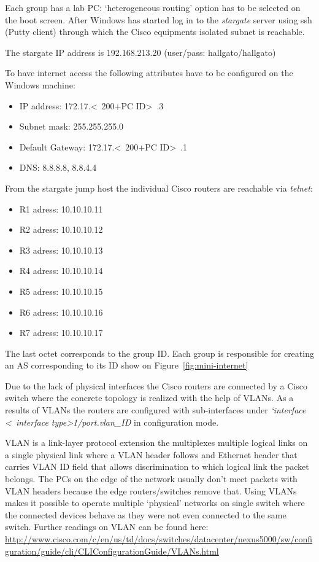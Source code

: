 \documentclass[a4paper]{article}
\begin{document}
Each group has a lab PC: `heterogeneous routing' option has to be selected on the boot screen. After Windows has started
log in to the \emph{stargate} server using ssh (Putty client) through which the Cisco equipments isolated subnet is reachable.

The stargate IP address is 192.168.213.20 (user/pass: hallgato/hallgato)

To have internet access the following attributes have to be configured on the Windows machine:
\begin{itemize}
    \item IP address: 172.17.\textless~200+PC ID\textgreater~.3
    \item Subnet mask: 255.255.255.0
    \item Default Gateway: 172.17.\textless~200+PC ID\textgreater~.1
    \item DNS: 8.8.8.8, 8.8.4.4
\end{itemize}

From the stargate jump host the individual Cisco routers are reachable via \emph{telnet}:
\begin{itemize}
    \item R1 adress: 10.10.10.11
    \item R2 adress: 10.10.10.12
    \item R3 adress: 10.10.10.13
    \item R4 adress: 10.10.10.14
    \item R5 adress: 10.10.10.15
    \item R6 adress: 10.10.10.16
    \item R7 adress: 10.10.10.17
\end{itemize}

The last octet corresponds to the group ID. Each group is responsible for creating an AS corresponding to its ID show
on Figure~\ref{fig:mini-internet}

Due to the lack of physical interfaces the Cisco routers are connected by a Cisco switch where the concrete topology is
realized with the help of VLANs. As a results of VLANs the routers are configured with sub-interfaces under
\emph{`interface \textless~interface type\textgreater 1/port.vlan\_ID} in configuration mode.

VLAN is a link-layer protocol extension the multiplexes multiple logical links on a single physical link where a VLAN
header follows and Ethernet header that carries VLAN ID field that allows discrimination to which logical link the
packet belongs. The PCs on the edge of the network usually don't meet packets with VLAN headers because the edge
routers/switches remove that. Using VLANs makes it possible to operate multiple `physical' networks on single switch
where the connected devices behave as they were not even connected to the same switch. Further readings on VLAN can be
found here:
\url{http://www.cisco.com/c/en/us/td/docs/switches/datacenter/nexus5000/sw/configuration/guide/cli/CLIConfigurationGuide/VLANs.html}
\end{document}
